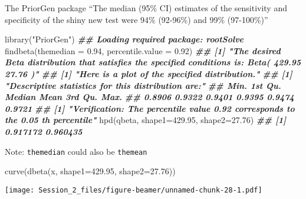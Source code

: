 \documentclass[
  ignorenonframetext,
  aspectratio=169,
]{beamer}
\newenvironment{Shaded}{\begin{snugshade}}{\end{snugshade}}
\newcommand{\AttributeTok}[1]{\textcolor[rgb]{0.77,0.63,0.00}{#1}}
\newcommand{\DocumentationTok}[1]{\textcolor[rgb]{0.56,0.35,0.01}{\textbf{\textit{#1}}}}
\newcommand{\FloatTok}[1]{\textcolor[rgb]{0.00,0.00,0.81}{#1}}
\newcommand{\FunctionTok}[1]{\textcolor[rgb]{0.00,0.00,0.00}{#1}}
\newcommand{\NormalTok}[1]{#1}
\newcommand{\StringTok}[1]{\textcolor[rgb]{0.31,0.60,0.02}{#1}}
\begin{document}
\begin{frame}[fragile]{The PriorGen package}
\protect\hypertarget{the-priorgen-package}{}
``The median (95\% CI) estimates of the sensitivity and specificity of
the shiny new test were 94\% (92-96\%) and 99\% (97-100\%)''

\scriptsize

\begin{Shaded}
\begin{Highlighting}[]
\FunctionTok{library}\NormalTok{(}\StringTok{"PriorGen"}\NormalTok{)}
\DocumentationTok{\#\# Loading required package: rootSolve}
\FunctionTok{findbeta}\NormalTok{(}\AttributeTok{themedian =} \FloatTok{0.94}\NormalTok{, }\AttributeTok{percentile.value =} \FloatTok{0.92}\NormalTok{)}
\DocumentationTok{\#\# [1] "The desired Beta distribution that satisfies the specified conditions is: Beta( 429.95 27.76 )"}
\DocumentationTok{\#\# [1] "Here is a plot of the specified distribution."}
\DocumentationTok{\#\# [1] "Descriptive statistics for this distribution are:"}
\DocumentationTok{\#\#    Min. 1st Qu.  Median    Mean 3rd Qu.    Max. }
\DocumentationTok{\#\#  0.8906  0.9322  0.9401  0.9395  0.9474  0.9721 }
\DocumentationTok{\#\# [1] "Verification: The percentile value 0.92 corresponds to the 0.05 th percentile"}
\FunctionTok{hpd}\NormalTok{(qbeta, }\AttributeTok{shape1=}\FloatTok{429.95}\NormalTok{, }\AttributeTok{shape2=}\FloatTok{27.76}\NormalTok{)}
\DocumentationTok{\#\# [1] 0.917172 0.960435}
\end{Highlighting}
\end{Shaded}

\normalsize

\pause

Note: \texttt{themedian} could also be \texttt{themean}
\end{frame}

\begin{frame}[fragile]
\scriptsize

\begin{Shaded}
\begin{Highlighting}[]
\FunctionTok{curve}\NormalTok{(}\FunctionTok{dbeta}\NormalTok{(x, }\AttributeTok{shape1=}\FloatTok{429.95}\NormalTok{, }\AttributeTok{shape2=}\FloatTok{27.76}\NormalTok{))}
\end{Highlighting}
\end{Shaded}

\texttt{[image: Session\_2\_files/figure-beamer/unnamed-chunk-28-1.pdf]}
\normalsize
\end{frame}
\end{document}

